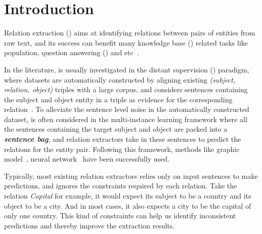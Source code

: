 \section{Introduction}

Relation extraction (\RE) aims at identifying relations between pairs of entities from raw text, and its success can benefit  many knowledge base (\KB) related tasks like \KB population, question answering (\QA) and etc~\cite{suchanek2013advances}.

In the literature, \RE is usually investigated in the distant supervision (\DS) paradigm, where datasets are automatically constructed by aligning existing \KB \emph{(subject, relation, object)} triples with a large corpus, and considers sentences containing the subject and object entity in a triple as evidence for the corresponding relation~\cite{riedel2010modeling}.
To alleviate the sentence level noise in the automatically constructed dataset, \RE is often considered in the multi-instance learning framework where all the sentences containing the target subject and object are packed into a \textbf{\emph{sentence bag}}, and relation extractors take in these sentences to predict the relations for the entity pair. 
Following this framework, methods like graphic model~\cite{surdeanu2012multi}, neural network~\cite{lin2016neural} have been successfully used.

Typically, most existing relation extractors relies only on input sentences to make predictions, and ignores the constraints required by each relation.
Take the relation \emph{Capital} for example, it would expect its subject to be a country and its object to be a city.
And in most cases, it also expects a city to be the capital of only one country.
This kind of constraints can help us identify inconsistent predictions and thereby improve the extraction results.

